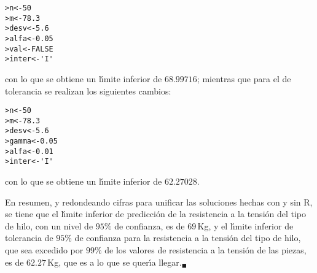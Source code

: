 \begin{solucion}
 \begin{verbatim}
>n<-50
>m<-78.3
>desv<-5.6
>alfa<-0.05
>val<-FALSE
>inter<-'I'
 \end{verbatim}
 \vspace{-0.5cm}
 con lo que se obtiene un l\'{\i}mite inferior de $68.99716$; mientras que para el de tolerancia se realizan los siguientes cambios:
 \begin{verbatim}
>n<-50
>m<-78.3
>desv<-5.6
>gamma<-0.05
>alfa<-0.01
>inter<-'I'
 \end{verbatim}
 \vspace{-0.5cm}
 con lo que se obtiene un l\'{\i}mite inferior de $62.27028$.
 \par 
 En resumen, y redondeando cifras para unificar las soluciones hechas con y sin R, se tiene que el l\'{\i}mite inferior de predicci\'on de la resistencia a la tensi\'on del tipo de hilo, con un nivel de $95\%$ de confianza, es de $69\,$Kg, y el l\'{\i}mite inferior de tolerancia de $95\%$ de confianza para la resistencia a la tensi\'on del tipo de hilo, que sea excedido por $99\%$ de los valores de resistencia a la tensi\'on de las piezas, es de $62.27\,$Kg, que es a lo que se quer\'{\i}a llegar.${}_{\blacksquare}$
\end{solucion}
